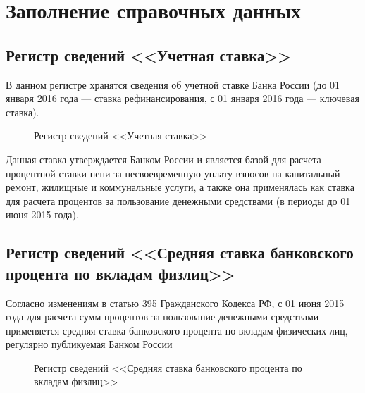 \documentclass[a4paper,12pt,draft]{article}
\begin{document}
\section{Заполнение справочных данных}

\subsection{Регистр сведений <<Учетная ставка>>}
В данном регистре хранятся сведения об учетной ставке Банка России (до 01 января 2016 года --- ставка рефинансирования, с 01 января 2016 года --- ключевая ставка).
\begin{figure}[h]
\caption{Регистр сведений <<Учетная ставка>>}
\label{ris:rs_uch}
\end{figure}

Данная ставка утверждается Банком России и является базой для расчета процентной ставки пени за несвоевременную уплату взносов на капитальный ремонт, жилищные и коммунальные услуги, а также она применялась как ставка для расчета процентов за пользование денежными средствами (в периоды до 01 июня 2015 года).
\subsection{Регистр сведений <<Средняя ставка банковского процента по вкладам физлиц>>}
Согласно изменениям в статью 395 Гражданского Кодекса РФ, с 01 июня 2015 года для расчета сумм процентов за пользование денежными средствами применяется средняя ставка банковского процента по вкладам физических лиц, регулярно публикуемая Банком России
\begin{figure}[h]
\caption{Регистр сведений <<Средняя ставка банковского процента по вкладам физлиц>>}
\label{ris:rs_fl}
\end{figure}
\end{document}
